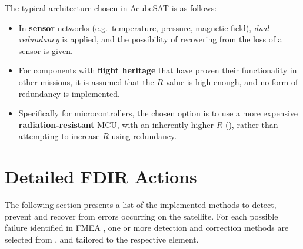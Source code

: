 \documentclass[a4paper,nobib]{tufte-book}
\begin{document}
The typical architecture chosen in AcubeSAT is as follows:
\begin{itemize}
	\item In \textbf{sensor} networks (e.g.\ temperature, pressure, magnetic field), \emph{dual redundancy} is applied, and the possibility of recovering from the loss of a sensor is given.
	\item For components with \textbf{flight heritage} that have proven their functionality in other missions, it is assumed that the \( R \) value is high enough, and no form of redundancy is implemented.
	\item Specifically for microcontrollers, the chosen option is to use a more expensive \textbf{radiation-resistant} \acs{MCU}, with an inherently higher \( R \) (), rather than attempting to increase \( R \) using redundancy.
\end{itemize}

\FloatBarrier
\section{Detailed \acs{FDIR} Actions}

The following section presents a list of the implemented methods to detect, prevent and recover from errors occurring on the satellite. For each possible failure identified in \acs{FMEA} \autocite{retselis_acubesat_fmea_2020}, one or more detection and correction methods are selected from , and tailored to the respective element.


\clearpage
\end{document}
